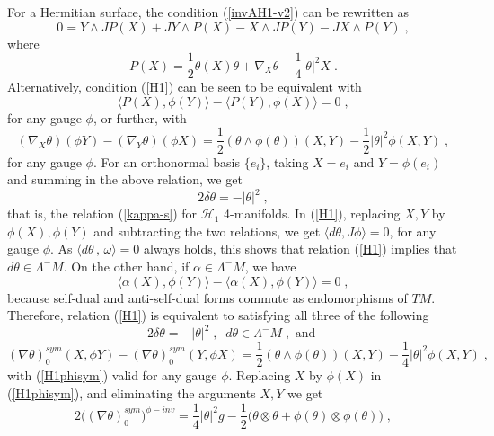 \documentclass{amsart}
\begin{document}
\noindent
For a Hermitian surface, the condition (\ref{invAH1-v2}) can be rewritten as
\begin{equation} \label{H1}
0 = Y \wedge JP(X) + JY \wedge P(X) - X \wedge JP(Y) - JX \wedge P(Y) \; ,  
\end{equation}
where
$$P(X) = \frac{1}{2} \theta(X) \theta + \nabla_X \theta - \frac{1}{4} |\theta|^2 X \; .$$
Alternatively, condition (\ref{H1}) can be seen to be equivalent with
$$\langle P(X) , \phi(Y) \rangle - \langle P(Y) , \phi(X) \rangle = 0 \; ,$$
for any gauge $\phi$, or further, with
\begin{equation} \label{H1phi}
(\nabla_X \theta)(\phi Y) - (\nabla_Y \theta)(\phi X) = \frac{1}{2} (\theta \wedge \phi(\theta) )(X,Y) - \frac{1}{2} |\theta|^2 \phi(X,Y) \; ,
\end{equation}
for any gauge $\phi$. For an orthonormal basis $\{e_i \}$, taking $X=e_i$ and $Y = \phi(e_i)$ and summing in the above relation, we get
$$2\delta \theta = - |\theta|^2 \; ,$$
that is, the relation (\ref{kappa-s}) for $\mathcal{H}_1$ 4-manifolds.
In (\ref{H1}), replacing $X,Y$ by $\phi(X), \phi(Y)$ and subtracting the two relations, we get $\langle d \theta , J\phi \rangle = 0$, for any gauge $\phi$. As $\langle d\theta \, , \, \omega \rangle = 0$ always holds, this shows that relation (\ref{H1}) implies that $d \theta \in \Lambda^{-}M$. On the other hand, if $\alpha \in \Lambda^{-} M$, we have 
$$ \langle \alpha(X) , \phi(Y) \rangle  - \langle \alpha(X) , \phi(Y) \rangle = 0 \; ,  $$
because self-dual and anti-self-dual forms commute as endomorphisms of $TM$.
Therefore, relation (\ref{H1}) is equivalent to satisfying all three of the following
\begin{equation} \label{H11and2}
   2\delta \theta = - |\theta|^2 \; , \; \; d \theta \in \Lambda^{-}M \; , \mbox{ and } 
\end{equation}
\begin{equation} \label{H1phisym}
(\nabla \theta)_0^{sym}(X, \phi Y) - (\nabla \theta)_0^{sym}(Y,\phi X) = \frac{1}{2} (\theta \wedge \phi(\theta) )(X,Y) - \frac{1}{4} |\theta|^2 \phi(X,Y) \; ,
\end{equation}
with (\ref{H1phisym}) valid for any gauge $\phi$. Replacing $X$ by $\phi(X)$ in (\ref{H1phisym}), and eliminating the arguments $X,Y$ we get
\begin{equation} \label{H1phisym2} \nonumber
2\big( (\nabla \theta)_0^{sym} \big)^{\phi-inv} = \frac{1}{4} |\theta|^2 g - \frac{1}{2} \big( \theta \otimes \theta + \phi(\theta) \otimes \phi(\theta) \big) \; ,
\end{equation}
\end{document}
